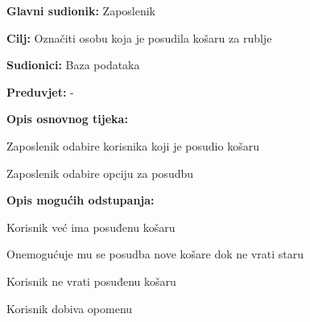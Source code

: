 \noindent {}
\begin{packed_item}
	
	\item \textbf{Glavni sudionik: }Zaposlenik
	\item  \textbf{Cilj:} Označiti osobu koja je posudila košaru za rublje
	\item  \textbf{Sudionici:} Baza podataka
	\item  \textbf{Preduvjet:} -
	\item  \textbf{Opis osnovnog tijeka:}
	
	\item[] \begin{packed_enum}
		
		\item Zaposlenik odabire korisnika koji je posudio košaru
		\item Zaposlenik odabire opciju za posudbu  
		
	\end{packed_enum}
	
	\item  \textbf{Opis mogućih odstupanja:}
	
	\item[] \begin{packed_item}
		
		\item[2.a] Korisnik već ima posuđenu košaru 
		\item[] \begin{packed_enum}
			
			\item Onemogućuje mu se posudba nove košare dok ne vrati staru
			
		\end{packed_enum}
		\item[2.b] Korisnik ne vrati posuđenu košaru
		\item[] \begin{packed_enum}
			
			\item Korisnik dobiva opomenu
			
		\end{packed_enum}
		
		
	\end{packed_item}
\end{packed_item}
\noindent {}
